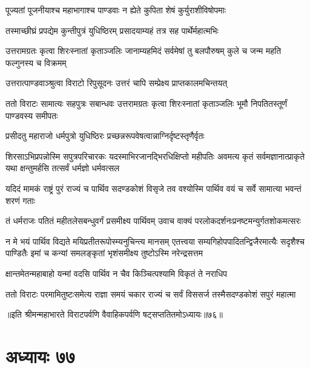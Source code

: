 \twolineshloka
{पूज्यतां पूजनीयाश्च महाभागाश्च पाण्डवाः}
{न ह्येते कुपिता शेषं कुर्युराशीविषोपमाः}


\twolineshloka
{तस्माच्छीघ्रं प्रपद्येम कुन्तीपुत्रं युधिष्ठिरम्}
{प्रसादयाम्यहं तत्र सह पार्थेर्महात्मभिः}


\threelineshloka
{उत्तरामग्रतः कृत्वा शिरःस्नातां कृताञ्जलिः}
{जानाम्यहमिदं सर्वमेषां तु बलपौरुषम्}
{कुले च जन्म महति फल्गुनस्य च विक्रमम्}




\twolineshloka
{उत्तरात्पाण्डवाञ्श्रुत्वा विराटो रिपुसूदनः}
{उत्तरं चापि सम्प्रेक्ष्य प्राप्तकालमचिन्तयत्}


\threelineshloka
{ततो विराटः सामात्यः सहपुत्रः सबान्धवः}
{उत्तरामग्रतः कृत्वा शिरःस्नातां कृताञ्जलिः}
{भूमौ निपतितस्तूर्णं पाण्डवस्य समीपतः}




\twolineshloka
{प्रसीदतु महाराजो धर्मपुत्रो युधिष्ठिरः}
{प्रच्छन्नरूपवेषत्वान्नाग्निर्दृष्टस्तृणैर्वृतः}


\onelineshloka
{शिरसाऽभिप्रपन्नोस्मि सपुत्रपरिचारकः}
\threelineshloka
{यदस्माभिरजानद्भिरधिक्षिप्तो महीपतिः}
{अवमत्य कृतं सर्वमज्ञानात्प्राकृते यथा}
{क्षन्तुमर्हसि तत्सर्वं धर्मज्ञो धर्मवत्सल}


\threelineshloka
{यदिदं मामकं राष्ट्रं पुरं राज्यं च पार्थिव}
{सदण्डकोशं विसृजे तव वश्योस्मि पार्थिव}
{वयं च सर्वे सामात्या भवन्तं शरणं गताः}



\twolineshloka
{तं धर्मराजः पतितं महीतलेसबन्धुवर्गं प्रसमीक्ष्य पार्थिवम्}
{उवाच वाक्यं परलोकदर्शनःप्रनष्टमन्युर्गतशोकमत्सरः}


\threelineshloka
{न मे भयं पार्थिव विद्यते मयिप्रतीतरूपोस्म्यनुचिन्त्य मानसम्}
{एतत्त्वया सम्यगिहोपपादितन्द्विजैरमात्यैः सदृशैश्च पाण्डितैः}
{इमां च कन्यां समलङ्कृतां भृशंसमीक्ष्य तुष्टोऽस्मि नरेन्द्रसत्तम}


\twolineshloka
{क्षान्तमेतन्महाबाहो यन्मां वदसि पार्थिव}
{न चैव किञ्चित्पश्यामि विकृतं ते नराधिप}



\twolineshloka
{ततो विराटः परमामितुष्टःसमेत्य राज्ञा समयं चकार}
{राज्यं च सर्वं विससर्ज तस्मैसदण्डकोशं सपुरं महात्मा}

॥इति श्रीमन्महाभारते विराटपर्वणि वैवाहिकपर्वणि षट्सप्ततितमोऽध्यायः॥७६॥

\chapter{अध्यायः ७७}


